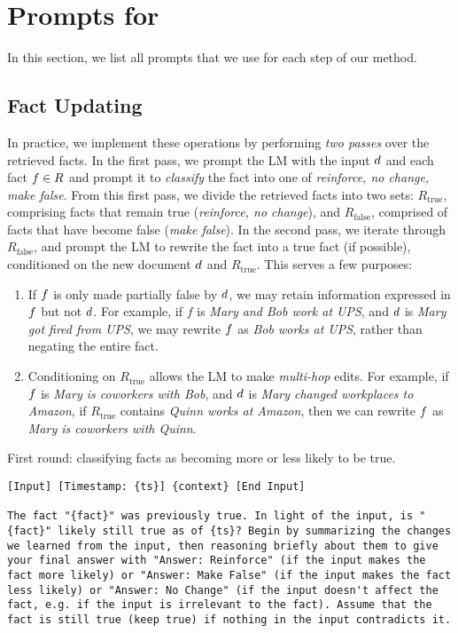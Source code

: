 
\section{Prompts for \ourmethod}
\label{app:prompts}
In this section, we list all prompts that we use for each step of our method.

\subsection{Fact Updating}
\label{app:update_prompts}
In practice, we implement these operations by performing \textit{two passes} over the retrieved facts. In the first pass, we prompt the LM with the input $d$ and each fact $f\in R$ and prompt it to \textit{classify} the fact into one of \textit{reinforce, no change, make false}.
From this first pass, we divide the retrieved facts into two sets: $R_\text{true}$, comprising facts that remain true (\textit{reinforce, no change}), and $R_\text{false}$, comprised of facts that have become false (\textit{make false}).
In the second pass, we iterate through $R_\text{false}$, and prompt the LM to rewrite the fact into a true fact (if possible), conditioned on the new document $d$ and $R_\text{true}$. This serves a few purposes:
\begin{enumerate}
\item If $f$ is only made partially false by $d$, we may retain information expressed in $f$ but not $d$. For example, if $f$ is \textit{Mary and Bob work at UPS}, and $d$ is \textit{Mary got fired from UPS}, we may rewrite $f$ as \textit{Bob works at UPS}, rather than negating the entire fact.
\item Conditioning on $R_\text{true}$ allows the LM to make \textit{multi-hop} edits. For example, if $f$ is \textit{Mary is coworkers with Bob}, and $d$ is \textit{Mary changed workplaces to Amazon}, if $R_\text{true}$ contains \textit{Quinn works at Amazon}, then we can rewrite $f$ as \textit{Mary is coworkers with Quinn}.
\end{enumerate}


First round: classifying facts as becoming more or less likely to be true. 
\begin{lstlisting}
[Input] [Timestamp: {ts}] {context} [End Input]

The fact "{fact}" was previously true. In light of the input, is "{fact}" likely still true as of {ts}? Begin by summarizing the changes we learned from the input, then reasoning briefly about them to give your final answer with "Answer: Reinforce" (if the input makes the fact more likely) or "Answer: Make False" (if the input makes the fact less likely) or "Answer: No Change" (if the input doesn't affect the fact, e.g. if the input is irrelevant to the fact). Assume that the fact is still true (keep true) if nothing in the input contradicts it.
\end{lstlisting}

